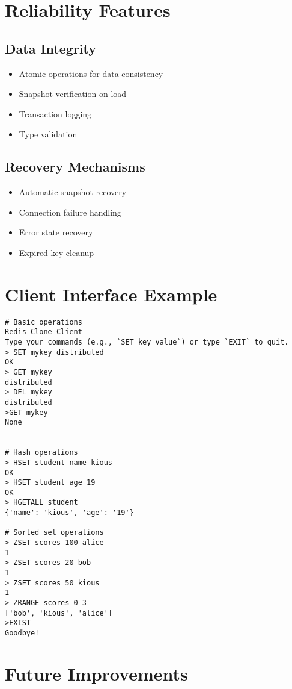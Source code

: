 \documentclass[11pt]{article}
\begin{document}
\section{Reliability Features}

\subsection{Data Integrity}
\begin{itemize}
    \item Atomic operations for data consistency
    \item Snapshot verification on load
    \item Transaction logging
    \item Type validation
\end{itemize}

\subsection{Recovery Mechanisms}
\begin{itemize}
    \item Automatic snapshot recovery
    \item Connection failure handling
    \item Error state recovery
    \item Expired key cleanup
\end{itemize}

\section{Client Interface Example}
\begin{lstlisting}
# Basic operations
Redis Clone Client
Type your commands (e.g., `SET key value`) or type `EXIT` to quit.
> SET mykey distributed
OK
> GET mykey  
distributed
> DEL mykey
distributed
>GET mykey
None


# Hash operations
> HSET student name kious
OK
> HSET student age 19
OK
> HGETALL student
{'name': 'kious', 'age': '19'}

# Sorted set operations
> ZSET scores 100 alice
1
> ZSET scores 20 bob
1
> ZSET scores 50 kious
1
> ZRANGE scores 0 3
['bob', 'kious', 'alice']
>EXIST
Goodbye!

\end{lstlisting}

\section{Future Improvements}
\end{document}
